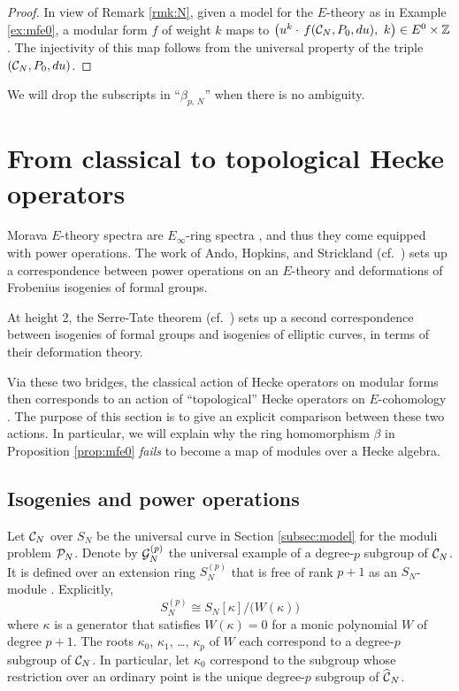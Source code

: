 \documentclass{gtpart}
\theoremstyle{definition}
\theoremstyle{remark}
\newcommand{\mb}[1]{\mathbb{#1}}
\newcommand{\CC}{{\cal C}}
\newcommand{\CG}{{\cal G}}
\newcommand{\CP}{{\cal P}}
\newcommand{\BZ}{{\mb Z}}
\newcommand{\HCC}{\widehat{~\!\!\CC}}
\newcommand{\B}{\beta}
\newcommand{\K}{\kappa}
\renewcommand{\=}{\approx}
\renewcommand{\-}{\sim}
\numberwithin{equation}{section}
\begin{document}
\begin{proof}
 In view of Remark \ref{rmk:N}, given a model for the $E$-theory as in Example 
 \ref{ex:mfe0}, a modular form $f$ of weight $k$ maps to 
 $\big( u^k \cdot \, f(\CC_N, P_0, du), ~ k \big) \in E^0 \times \BZ$.  The 
 injectivity of this map follows from the universal property of the triple 
 $(\CC_N, P_0, du)$.  
\end{proof}

We will drop the subscripts in ``$\B_{p,\,N}$'' when there is no ambiguity.  



\section{From classical to topological Hecke operators}
\label{sec:ct}

Morava $E$-theory spectra are $E_\infty$-ring spectra \cite[Corollary 7.6]{GH}, 
and thus they come equipped with power operations.  The work of Ando, Hopkins, 
and Strickland \cite{AHS04} (cf.~\cite[Theorem B]{cong}) sets up a 
correspondence between power operations on an $E$-theory and deformations of 
Frobenius isogenies of formal groups.  

At height 2, the Serre-Tate theorem \cite{LST} (cf.~\cite[Theorem 2.9.1]{KM}) 
sets up a second correspondence between isogenies of formal groups and isogenies 
of elliptic curves, in terms of their deformation theory.  

Via these two bridges, the classical action of Hecke operators on modular forms 
then corresponds to an action of ``topological'' Hecke operators on 
$E$-cohomology \cite[Section 14]{log}.  The purpose of this section is to give 
an explicit comparison between these two actions.  In particular, we will 
explain why the ring homomorphism $\B$ in Proposition \ref{prop:mfe0} 
{\em fails} to become a map of modules over a Hecke algebra.  



\subsection{Isogenies and power operations}
\label{subsec:po}

Let $\CC_N$ over $S_N$ be the universal curve in Section \ref{subsec:model} for 
the moduli problem $\CP_N$.  Denote by $\CG_N^{(p)}$ the universal example of a 
degree-$p$ subgroup of $\CC_N$.  It is defined over an extension ring 
$S_N^{(p)}$ that is free of rank $p + 1$ as an $S_N$-module 
\cite[Theorem 6.6.1]{KM}.  Explicitly, 
\[
 S_N^{(p)} \cong S_N[\K] / \big(W(\K)\big) 
\]
where $\K$ is a generator that satisfies $W(\K) = 0$ for a monic polynomial $W$ 
of degree $p + 1$.  The roots $\K_0$, $\K_1$, \ldots, $\K_p$ of $W$ each 
correspond to a degree-$p$ subgroup of $\CC_N$.  In particular, let $\K_0$ 
correspond to the subgroup whose restriction over an ordinary point is the 
unique degree-$p$ subgroup of $\HCC_N$.  
\end{document}
